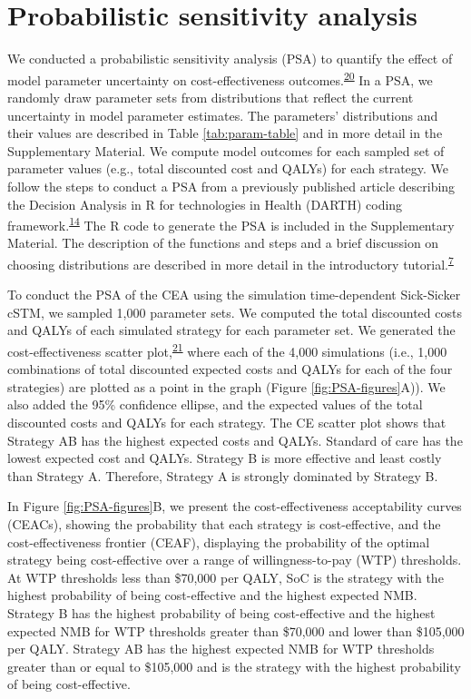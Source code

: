 \documentclass[
]{article}
\begin{document}
\hypertarget{probabilistic-sensitivity-analysis}{%
\section{Probabilistic sensitivity analysis}\label{probabilistic-sensitivity-analysis}}

We conducted a probabilistic sensitivity analysis (PSA) to quantify the effect of model parameter uncertainty on cost-effectiveness outcomes.\textsuperscript{\protect\hyperlink{ref-Briggs2012}{20}} In a PSA, we randomly draw parameter sets from distributions that reflect the current uncertainty in model parameter estimates. The parameters' distributions and their values are described in Table \ref{tab:param-table} and in more detail in the Supplementary Material. We compute model outcomes for each sampled set of parameter values (e.g., total discounted cost and QALYs) for each strategy. We follow the steps to conduct a PSA from a previously published article describing the Decision Analysis in R for technologies in Health (DARTH) coding framework.\textsuperscript{\protect\hyperlink{ref-Alarid-Escudero2019e}{14}} The R code to generate the PSA is included in the Supplementary Material. The description of the functions and steps and a brief discussion on choosing distributions are described in more detail in the introductory tutorial.\textsuperscript{\protect\hyperlink{ref-Alarid-Escudero2022b}{7}}

To conduct the PSA of the CEA using the simulation time-dependent Sick-Sicker cSTM, we sampled 1,000 parameter sets. We computed the total discounted costs and QALYs of each simulated strategy for each parameter set. We generated the cost-effectiveness scatter plot,\textsuperscript{\protect\hyperlink{ref-Briggs2002}{21}} where each of the 4,000 simulations (i.e., 1,000 combinations of total discounted expected costs and QALYs for each of the four strategies) are plotted as a point in the graph (Figure \ref{fig:PSA-figures}A)). We also added the 95\% confidence ellipse, and the expected values of the total discounted costs and QALYs for each strategy. The CE scatter plot shows that Strategy AB has the highest expected costs and QALYs. Standard of care has the lowest expected cost and QALYs. Strategy B is more effective and least costly than Strategy A. Therefore, Strategy A is strongly dominated by Strategy B.

In Figure \ref{fig:PSA-figures}B, we present the cost-effectiveness acceptability curves (CEACs), showing the probability that each strategy is cost-effective, and the cost-effectiveness frontier (CEAF), displaying the probability of the optimal strategy being cost-effective over a range of willingness-to-pay (WTP) thresholds. At WTP thresholds less than \$70,000 per QALY, SoC is the strategy with the highest probability of being cost-effective and the highest expected NMB. Strategy B has the highest probability of being cost-effective and the highest expected NMB for WTP thresholds greater than \$70,000 and lower than \$105,000 per QALY. Strategy AB has the highest expected NMB for WTP thresholds greater than or equal to \$105,000 and is the strategy with the highest probability of being cost-effective.
\end{document}
